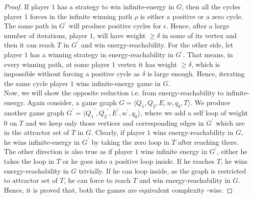 \begin{proof}
If player $1$ has a strategy to win infinite-energy in $G$, then all the cycles player $1$ forces in the infinite winning path $\rho$ is either a positive or a zero cycle. The same path in $G^{\prime}$ will produce positive cycles for $\epsilon$. Hence, after a large number of iterations, player $1$, will have weight $\geq \delta$ in some of its vertex and then it can reach $T$ in $G^{\prime}$ and win energy-reachability. For the other side, let player $1$ has a winning strategy in energy-reachability in $G^{\prime}$. That means, in every winning path, at some player $1$ vertex it has weight $\geq \delta$, which is impossible without forcing a positive cycle as $\delta$ is large enough. Hence, iterating the same cycle player $1$ wins infinite-energy game in $G$.\\
Now, we will show the opposite reduction i.e. from energy-reachability to infinite-energy. Again consider, a game graph $G=\langle Q_1, Q_2, E, w, q_0, T\rangle$. We produce another game graph $G^{\prime}=\langle {Q_1}^{\prime}, {Q_2}^{\prime}, E^{\prime}, w^{\prime}, q_0\rangle$, where we add a self loop of weight $0$ on $T$ and we keep only those vertices and corresponding edges in $G^{\prime}$ which are in the attractor set of $T$ in $G$. Clearly, if player $1$ wins energy-reachability in $G$, he wins infinite-energy in $G^{\prime}$ by taking the zero loop in $T$ after reaching there. The other direction is also true as if player $1$ wins infinite energy in $G^{\prime}$, either he takes the loop in $T$ or he goes into a positive loop inside. If he reaches $T$, he wins energy-reachability in $G$ trivially. If he can loop inside, as the graph is restricted to attractor set of $T$, he can force to reach $T$ and win energy-reachability in $G$. Hence, it is proved that, both the games are equivalent complexity -wise.
\end{proof}

